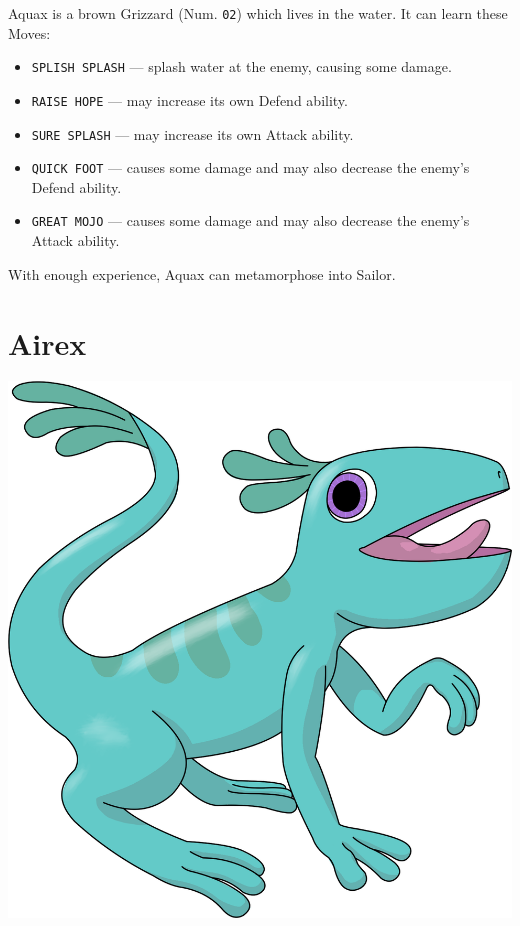 \documentclass[10pt,twocolumn,openany,article]{memoir}
\newenvironment{ritemize}{\begin{itemize}\raggedright}{\end{itemize}}
\begin{document}
Aquax is a  brown Grizzard (Num. \texttt{02}) which lives  in the water.
It can learn these Moves:

\begin{ritemize}
\item  \texttt{SPLISH SPLASH}  --- splash  water at  the enemy,  causing
  some damage. 
\item \texttt{RAISE HOPE} --- may increase its own Defend ability.
\item \texttt{SURE SPLASH} --- may increase its own Attack ability.
\item \texttt{QUICK FOOT}  --- causes some damage and  may also decrease
  the enemy's Defend ability.
\item \texttt{GREAT MOJO}  --- causes some damage and  may also decrease
  the enemy's Attack ability.
\end{ritemize}

With enough experience, Aquax can metamorphose into Sailor.

\ifdefined\DEMO\else

\section{Airex}

\begin{center}
  \includegraphics[width=\columnwidth]{../Manual/Airex.png}
\end{center}
\end{document}
